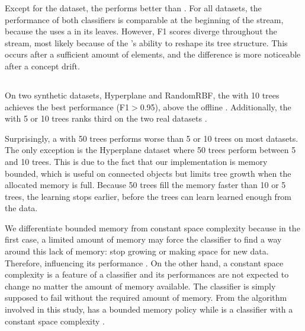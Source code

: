 Except for the \banosdataset dataset, the \hoeffdingtree performs better
than \naivebayes. For all datasets, the performance of both classifiers is
comparable at the beginning of the stream, because the \hoeffdingtree uses
a \naivebayes in its leaves.  However, F1 scores diverge throughout the
stream, most likely because of the \hoeffdingtree's ability to reshape its
tree structure.  This occurs after a sufficient amount of elements, and the
difference is more noticeable after a concept drift.

\subsection{\mondrianforest}

On two synthetic datasets, Hyperplane and RandomRBF, the \mondrianforest
with 10 trees  achieves the best performance (F1$>$0.95), above the offline \knn.
Additionally, the \mondrianforest with 5 or 10 trees ranks third on the two real
datasets .

Surprisingly, a \mondrianforest with 50 trees performs worse than 5 or 10
trees on most datasets. The only exception is the Hyperplane dataset where
50 trees perform between 5 and 10 trees. This is due to the fact that
our \mondrianforest implementation is memory bounded, which is
useful on connected objects but limits tree growth when the allocated memory is
full. Because 50 trees fill the memory faster than 10 or 5 trees, the
learning stops earlier, before the trees can learn learned enough
from the data.

We differentiate bounded memory from constant space complexity because in the
first case, a limited amount of memory may force the classifier to find a way
around this lack of memory: stop growing or making space for new data.
Therefore, influencing its performance .  On the other hand, a constant space
complexity is a feature of a classifier and its performances are not expected
to change no  matter the amount of memory available. The classifier is simply
supposed to fail without the required amount of memory. From the algorithm
involved in this study, \mondrianforest has a bounded memory policy while
\naivebayes is a classifier with a constant space complexity .

